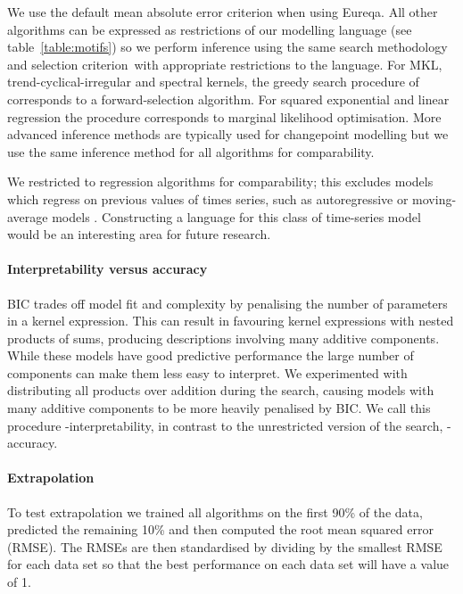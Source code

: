 We use the default mean absolute error criterion when using Eureqa.
All other algorithms can be expressed as restrictions of our modelling language (see table~\ref{table:motifs}) so we perform inference using the same search methodology and selection criterion\footnotemark~with appropriate restrictions to the language.
For MKL, trend-cyclical-irregular and spectral kernels, the greedy search procedure of \procedurename{} corresponds to a forward-selection algorithm.
For squared exponential and linear regression the procedure corresponds to marginal likelihood optimisation.
More advanced inference methods are typically used for changepoint modelling but we use the same inference method for all algorithms for comparability.

We restricted to regression algorithms for comparability; this excludes models which regress on previous values of times series, such as autoregressive or moving-average models \citep[e.g.][]{Box1976-qk}.
Constructing a language for this class of time-series model would be an interesting area for future research.

\paragraph{Interpretability versus accuracy}

BIC trades off model fit and complexity by penalising the number of parameters in a kernel expression.
This can result in \procedurename{} favouring kernel expressions with nested products of sums, producing descriptions involving many additive components.
While these models have good predictive performance the large number of components can make them less easy to interpret.
We experimented with distributing all products over addition during the search, causing models with many additive components to be more heavily penalised by BIC.
We call this procedure \procedurename{}-interpretability, in contrast to the unrestricted version of the search, \procedurename{}-accuracy.

\paragraph{Extrapolation}

To test extrapolation we trained all algorithms on the first 90\% of the data, predicted the remaining 10\% and then computed the root mean squared error (RMSE).
The RMSEs are then standardised by dividing by the smallest RMSE for each data set so that the best performance on each data set will have a value of 1.

